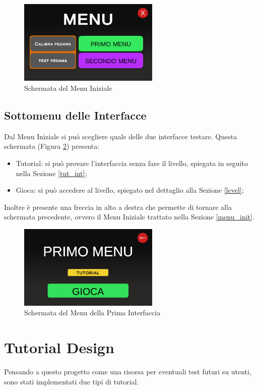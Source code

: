 \documentclass[target=bach,aauheader=]{thud}
\begin{document}
\begin{figure}[h]
    \centering
    \includegraphics[width=0.60\textwidth]{menu_screen}
    \caption{Schermata del Menu Iniziale}
    \label{fig:menu_screen}
\end{figure}

\subsection{Sottomenu delle Interfacce}
\label{menu_int}
Dal Menu Iniziale si può scegliere quale delle due interfacce testare.
Questa schermata (Figura \ref{fig:first_menu}) presenta:
\begin{itemize}
    \item Tutorial: si può provare l'interfaccia senza fare il livello, spiegata in seguito nella Sezione \ref{tut_int};
    \item Gioca: si può accedere al livello, spiegato nel dettaglio alla Sezione \ref{level};
\end{itemize}
Inoltre è presente una freccia in alto a destra che permette di tornare alla schermata precedente, ovvero il Menu Iniziale trattato nella Sezione \ref{menu_init}.

\begin{figure}[h]
    \centering
    \includegraphics[width=0.60\textwidth]{first_menu}
    \caption{Schermata del Menu della Prima Interfaccia}
    \label{fig:first_menu}
\end{figure}

\section{Tutorial Design}
Pensando a questo progetto come una risorsa per eventuali test futuri su utenti, sono stati implementati due tipi di tutorial.
\end{document}
